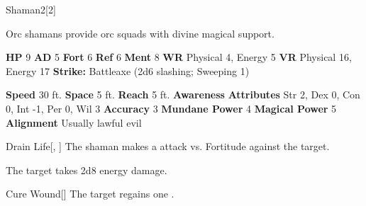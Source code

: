   \begin{monsubsection}{Shaman}{2}[2]
    \vspace{-1em}\vspace{-1em}
    \vspace{0em}

    
          Orc shamans provide orc squads with divine magical support.
        

    \begin{spellcontent}
      \begin{spelltargetinginfo}
        \pari \textbf{HP} 9 \monsep
          \textbf{AD} 5 \monsep
          \textbf{Fort} 6 \monsep
          \textbf{Ref} 6 \monsep
          \textbf{Ment} 8
        \pari \textbf{WR} Physical 4, Energy 5 \monsep
        \textbf{VR} Physical 16, Energy 17
        \pari \textbf{Strike:}
            Battleaxe  (2d6 slashing; Sweeping 1)
      \end{spelltargetinginfo}
    \end{spellcontent}
    \begin{monsterfooter}
      \pari \textbf{Speed} 30 ft. \monsep
        \textbf{Space} 5 ft. \monsep
        \textbf{Reach} 5 ft.
      \pari \textbf{Awareness} 
      \pari \textbf{Attributes}
        Str 2, Dex 0,
        Con 0, Int -1,
        Per 0, Wil 3
      \pari \textbf{Accuracy} 3 \monsep
        \textbf{Mundane Power} 4 \monsep
      \textbf{Magical Power} 5
      \pari \textbf{Alignment} Usually lawful evil
    \end{monsterfooter}
  \end{monsubsection}
  \begin{freeability}{Drain Life}[, ]
       The shaman makes a  attack
        vs. Fortitude against the target.
    
    \hit The target takes 2d8 energy damage.
    \end{freeability}
  
      
    \begin{freeability}{Cure Wound}[]
      The target regains one .
    \end{freeability}
  
